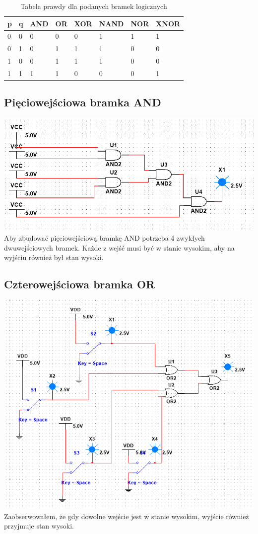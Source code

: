 \documentclass[12pt,a4paper]{article}
\begin{document}
\begin{table}[H]
\begin{center}

\label{logiczne}
\begin{tabular}{|p{1.1cm}|p{1.1cm}|p{1.1cm}|p{1.1cm}|p{1.1cm}|p{1.1cm}|p{1.1cm}|p{1.1cm}|}
\hline
p & q & AND & OR & XOR & NAND & NOR & XNOR \\ \hline
0 & 0 & 0 & 0 & 0 & 1 & 1 & 1 \\ \hline
0 & 1 & 0 & 1 & 1 & 1 & 0 & 0 \\ \hline
1 & 0 & 0 & 1 & 1 & 1 & 0 & 0 \\ \hline
1 & 1 & 1 & 1 & 0 & 0 & 0 & 1 \\ \hline
\end{tabular}
\caption{Tabela prawdy dla podanych bramek logicznych}
\end{center}
\end{table}

\subsection{Pięciowejściowa bramka AND}
\includegraphics[width=\textwidth]{AND5}
Aby zbudować pięciowejściową bramkę AND potrzeba 4 zwykłych dwuwejściowych bramek. Każde z wejść musi być w stanie wysokim, aby na wyjściu również był stan wysoki.

\subsection{Czterowejściowa bramka OR}
\includegraphics[width=.9\textwidth]{OR4}
Zaobserwowałem, że gdy dowolne wejście jest w stanie wysokim, wyjście również przyjmuje stan wysoki. 
\end{document}
